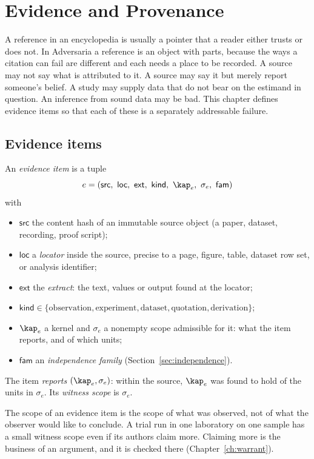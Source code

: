 \chapter{Evidence and Provenance}\label{ch:evidence}

A reference in an encyclopedia is usually a pointer that a reader either trusts or does not. In Adversaria a reference is an object with parts, because the ways a citation can fail are different and each needs a place to be recorded. A source may not say what is attributed to it. A source may say it but merely report someone's belief. A study may supply data that do not bear on the estimand in question. An inference from sound data may be bad. This chapter defines evidence items so that each of these is a separately addressable failure.

\section{Evidence items}

\begin{definition}\label{def:evidence}
An \emph{evidence item} is a tuple
\[
e=(\mathsf{src},\ \mathsf{loc},\ \mathsf{ext},\ \mathsf{kind},\ \kap_e,\ \sigma_e,\ \mathsf{fam})
\]
with
\begin{itemize}
\item $\mathsf{src}$ the content hash of an immutable source object (a paper, dataset, recording, proof script);
\item $\mathsf{loc}$ a \emph{locator} inside the source, precise to a page, figure, table, dataset row set, or analysis identifier;
\item $\mathsf{ext}$ the \emph{extract}: the text, values or output found at the locator;
\item $\mathsf{kind}\in\{\text{observation},\text{experiment},\text{dataset},\text{quotation},\text{derivation}\}$;
\item $\kap_e$ a kernel and $\sigma_e$ a nonempty scope admissible for it: what the item reports, and of which units;
\item $\mathsf{fam}$ an \emph{independence family} (Section~\ref{sec:independence}).
\end{itemize}
The item \emph{reports} $(\kap_e,\sigma_e)$: within the source, $\kap_e$ was found to hold of the units in $\sigma_e$. Its \emph{witness scope} is $\sigma_e$.
\end{definition}

The scope of an evidence item is the scope of what was observed, not of what the observer would like to conclude. A trial run in one laboratory on one sample has a small witness scope even if its authors claim more. Claiming more is the business of an argument, and it is checked there (Chapter~\ref{ch:warrant}).

